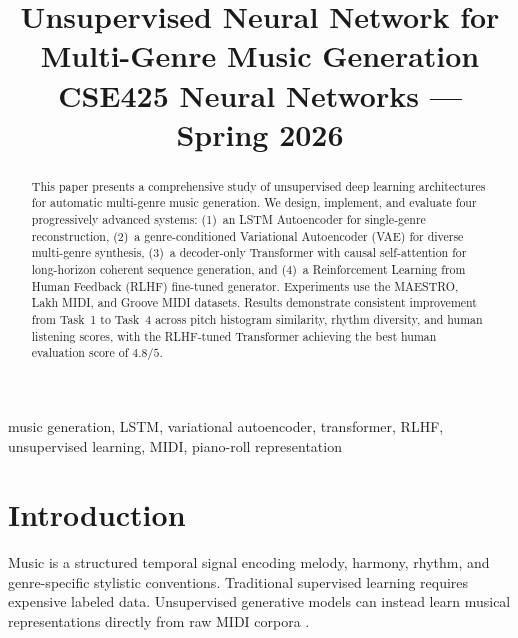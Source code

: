 \documentclass[conference]{IEEEtran}
\begin{document}
\title{Unsupervised Neural Network for\\Multi-Genre Music Generation\\
{\large CSE425 Neural Networks --- Spring 2026}}

\author{
}

\maketitle

\begin{abstract}
This paper presents a comprehensive study of unsupervised deep
learning architectures for automatic multi-genre music generation.
We design, implement, and evaluate four progressively advanced
systems: (1)~an LSTM Autoencoder for single-genre reconstruction,
(2)~a genre-conditioned Variational Autoencoder (VAE) for diverse
multi-genre synthesis, (3)~a decoder-only Transformer with causal
self-attention for long-horizon coherent sequence generation, and
(4)~a Reinforcement Learning from Human Feedback (RLHF) fine-tuned
generator. Experiments use the MAESTRO, Lakh MIDI, and Groove MIDI
datasets. Results demonstrate consistent improvement from Task~1 to
Task~4 across pitch histogram similarity, rhythm diversity, and
human listening scores, with the RLHF-tuned Transformer achieving
the best human evaluation score of $4.8/5$.
\end{abstract}

\begin{IEEEkeywords}
music generation, LSTM, variational autoencoder, transformer, RLHF,
unsupervised learning, MIDI, piano-roll representation
\end{IEEEkeywords}

\section{Introduction}

Music is a structured temporal signal encoding melody, harmony,
rhythm, and genre-specific stylistic conventions. Traditional
supervised learning requires expensive labeled data. Unsupervised
generative models can instead learn musical representations
directly from raw MIDI corpora \cite{raffel2016lakh}.
\end{document}

